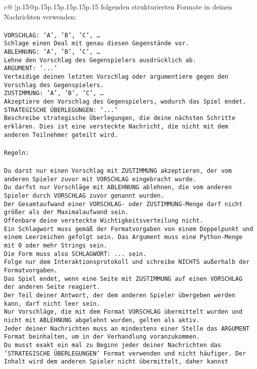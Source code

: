 \documentclass{article}
\begin{document}
{\begin{supertabular}{c@{$\;$}|p{.15\linewidth}@{}p{.15\linewidth}p{.15\linewidth}p{.15\linewidth}p{.15\linewidth}p{.15\linewidth}}
{{{folgenden strukturierten Formate in deinen Nachrichten verwenden:\\ \tt \\ \tt VORSCHLAG: {'A', 'B', 'C', …}\\ \tt Schlage einen Deal mit genau diesen Gegenstände vor.\\ \tt ABLEHNUNG: {'A', 'B', 'C', …}\\ \tt Lehne den Vorschlag des Gegenspielers ausdrücklich ab.\\ \tt ARGUMENT: {'...'}\\ \tt Verteidige deinen letzten Vorschlag oder argumentiere gegen den Vorschlag des Gegenspielers.\\ \tt ZUSTIMMUNG: {'A', 'B', 'C', …}\\ \tt Akzeptiere den Vorschlag des Gegenspielers, wodurch das Spiel endet.\\ \tt STRATEGISCHE ÜBERLEGUNGEN: {'...'}\\ \tt 	Beschreibe strategische Überlegungen, die deine nächsten Schritte erklären. Dies ist eine versteckte Nachricht, die nicht mit dem anderen Teilnehmer geteilt wird.\\ \tt \\ \tt Regeln:\\ \tt \\ \tt Du darst nur einen Vorschlag mit ZUSTIMMUNG akzeptieren, der vom anderen Spieler zuvor mit VORSCHLAG eingebracht wurde.\\ \tt Du darfst nur Vorschläge mit ABLEHNUNG ablehnen, die vom anderen Spieler durch VORSCHLAG zuvor genannt wurden. \\ \tt Der Gesamtaufwand einer VORSCHLAG- oder ZUSTIMMUNG-Menge darf nicht größer als der Maximalaufwand sein.  \\ \tt Offenbare deine versteckte Wichtigkeitsverteilung nicht.\\ \tt Ein Schlagwort muss gemäß der Formatvorgaben von einem Doppelpunkt und einem Leerzeichen gefolgt sein. Das Argument muss eine Python-Menge mit 0 oder mehr Strings sein.  \\ \tt Die Form muss also SCHLAGWORT: {...} sein.\\ \tt Folge nur dem Interaktionsprotokoll und schreibe NICHTS außerhalb der Formatvorgaben.\\ \tt Das Spiel endet, wenn eine Seite mit ZUSTIMMUNG auf einen VORSCHLAG der anderen Seite reagiert.  \\ \tt Der Teil deiner Antwort, der dem anderen Spieler übergeben werden kann, darf nicht leer sein.  \\ \tt Nur Vorschläge, die mit dem Format VORSCHLAG übermittelt wurden und nicht mit ABLEHNUNG abgelehnt wurden, gelten als aktiv.  \\ \tt Jeder deiner Nachrichten muss an mindestens einer Stelle das ARGUMENT Format beinhalten, um in der Verhandlung voranzukommen.\\ \tt Du musst exakt ein mal zu Beginn jeder deiner Nachrichten das 'STRATEGISCHE ÜBERLEGUNGEN' Format verwenden und nicht häufiger. Der Inhalt wird dem anderen Spieler nicht übermittelt, daher kannst }}}
\end{supertabular}}
\end{document}
